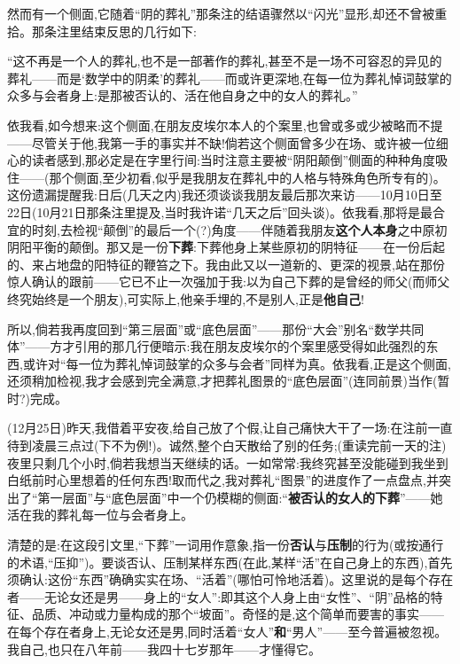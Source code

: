 然而有一个侧面,它随着“阴的葬礼”那条注的结语骤然以“闪光”显形,却还不曾被重拾。那条注里结束反思的几行如下:

“这不再是一个人的葬礼,也不是一部著作的葬礼,甚至不是一场不可容忍的异见的葬礼——而是‘数学中的阴柔’的葬礼——而或许更深地,在每一位为葬礼悼词鼓掌的众多与会者身上:是那被否认的、活在他自身之中的女人的葬礼。”

依我看,如今想来:这个侧面,在朋友皮埃尔本人的个案里,也曾或多或少被略而不提——尽管关于他,我第一手的事实并不缺!倘若这个侧面曾多少在场、或许被一位细心的读者感到,那必定是在字里行间:当时注意主要被“阴阳颠倒”侧面的种种角度吸住——(那个侧面,至少初看,似乎是我朋友在葬礼中的人格与特殊角色所专有的)。这份遗漏提醒我:日后(几天之内)我还须谈谈我朋友最后那次来访——10月10日至22日(10月21日那条注里提及,当时我许诺“几天之后”回头谈)。依我看,那将是最合宜的时刻,去检视“颠倒”的最后一个(?)角度——伴随着我朋友\textbf{这个人本身}之中原初阴阳平衡的颠倒。那又是一份\textbf{下葬}:下葬他身上某些原初的阴特征——在一份后起的、来占地盘的阳特征的鞭笞之下。我由此又以一道新的、更深的视景,站在那份惊人确认的跟前——它已不止一次强加于我:以为自己下葬的是曾经的师父(而师父终究始终是一个朋友),可实际上,他亲手埋的,不是别人,正是\textbf{他自己}!

所以,倘若我再度回到“第三层面”或“底色层面”——那份“大会”别名“数学共同体”——方才引用的那几行便暗示:我在朋友皮埃尔的个案里感受得如此强烈的东西,或许对“每一位为葬礼悼词鼓掌的众多与会者”同样为真。依我看,正是这个侧面\dmark{},还须稍加检视,我才会感到完全满意,才把葬礼图景的“底色层面”(连同前景)当作(暂时?)完成。

(12月25日)昨天,我借着平安夜,给自己放了个假,让自己痛快大干了一场:在注前一直待到凌晨三点过(下不为例!)。诚然,整个白天散给了别的任务;(重读完前一天的注)夜里只剩几个小时,倘若我想当天继续的话。一如常常:我终究甚至没能碰到我坐到白纸前时心里想着的任何东西!取而代之,我对葬礼“图景”的进度作了一点盘点,并突出了“第一层面”与“底色层面”中一个仍模糊的侧面:“\textbf{被否认的女人的下葬}”——她活在我的葬礼每一位与会者身上。

清楚的是:在这段引文里,“下葬”一词用作意象,指一份\textbf{否认}与\textbf{压制}的行为(或按通行的术语,“压抑”)。要谈否认、压制某样东西(在此,某样“活”在自己身上的东西),首先须确认:这份“东西”确确实实在场、“活着”(哪怕可怜地活着)。这里说的是每个存在者——无论女还是男——身上的“女人”:即其这个人身上由“女性”、“阴”品格的特征、品质、冲动或力量构成的那个“坡面”。奇怪的是,这个简单而要害的事实——在每个存在者身上,无论女还是男,同时活着“女人”\textbf{和}“男人”——至今普遍被忽视。我自己,也只在八年前——我四十七岁那年——才懂得它。

